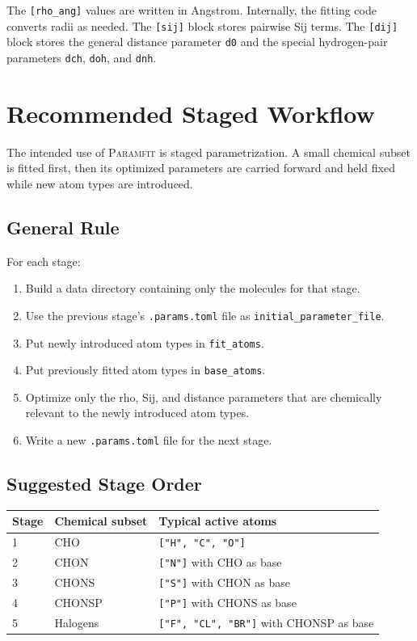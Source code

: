 \documentclass[11pt]{article}
\begin{document}
The \texttt{[rho\_ang]} values are written in Angstrom. Internally, the fitting
code converts radii as needed. The \texttt{[sij]} block stores pairwise Sij terms.
The \texttt{[dij]} block stores the general distance parameter \texttt{d0} and
the special hydrogen-pair parameters \texttt{dch}, \texttt{doh}, and
\texttt{dnh}.

\section{Recommended Staged Workflow}

The intended use of \textsc{Paramfit} is staged parametrization. A small chemical
subset is fitted first, then its optimized parameters are carried forward and
held fixed while new atom types are introduced.

\subsection{General Rule}

For each stage:

\begin{enumerate}[leftmargin=*]
  \item Build a data directory containing only the molecules for that stage.
  \item Use the previous stage's \texttt{.params.toml} file as
        \texttt{initial\_parameter\_file}.
  \item Put newly introduced atom types in \texttt{fit\_atoms}.
  \item Put previously fitted atom types in \texttt{base\_atoms}.
  \item Optimize only the rho, Sij, and distance parameters that are chemically
        relevant to the newly introduced atom types.
  \item Write a new \texttt{.params.toml} file for the next stage.
\end{enumerate}

\subsection{Suggested Stage Order}

\begin{center}
\begin{tabular}{lll}
\toprule
Stage & Chemical subset & Typical active atoms \\
\midrule
1 & CHO & \texttt{["H", "C", "O"]} \\
2 & CHON & \texttt{["N"]} with CHO as base \\
3 & CHONS & \texttt{["S"]} with CHON as base \\
4 & CHONSP & \texttt{["P"]} with CHONS as base \\
5 & Halogens & \texttt{["F", "CL", "BR"]} with CHONSP as base \\
\bottomrule
\end{tabular}
\end{center}
\end{document}
